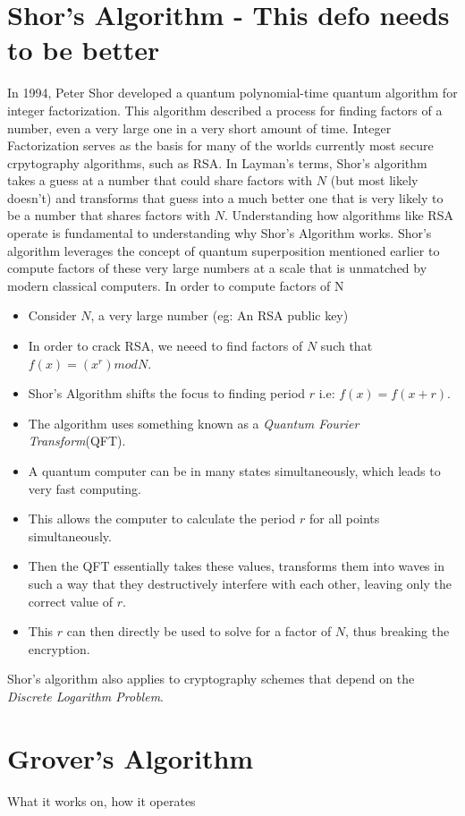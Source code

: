 \documentclass[journal]{IEEEtran}
\begin{document}
\section{Shor's Algorithm - This defo needs to be better}
In 1994, Peter Shor developed a quantum polynomial-time quantum algorithm for integer factorization. This algorithm 
described a process for finding factors of a number, even a very large one in a very short amount of time. Integer Factorization
serves as the basis for many of the worlds currently most secure crpytography algorithms, such as RSA. In Layman's terms, Shor's algorithm takes
a guess at a number that could share factors with $N$ (but most likely doesn't) and transforms that guess into a much better one
that is very likely to be a number that shares factors with $N$. Understanding how algorithms like RSA operate is fundamental to understanding why Shor's Algorithm works.
Shor's algorithm leverages the concept of quantum superposition mentioned earlier to
compute factors of these very large numbers at a scale that is unmatched by modern classical computers. In order to compute factors of N
\begin{itemize}
  \item Consider $N$, a very large number (eg: An RSA public key)
  \item In order to crack RSA, we neeed to find factors of $N$ such that $f(x)=(x^r) mod N$.
  \item Shor's Algorithm shifts the focus to finding period $r$ i.e: $f(x)=f(x+r)$. 
  \item The algorithm uses something known as a \emph{Quantum Fourier Transform}(QFT).
  \item A quantum computer can be in many states simultaneously, which leads to very fast computing.
  \item This allows the computer to calculate the period $r$ for all points simultaneously.
  \item 
  Then the QFT essentially takes these values, transforms them into waves in such a way that they 
  destructively interfere with each other, leaving only the correct value of $r$.
  \item This $r$ can then directly be used to solve for a factor of $N$, thus breaking the encryption.
\end{itemize}
Shor's algorithm also applies to cryptography schemes that depend on the \emph{Discrete Logarithm Problem}.

\section{Grover's Algorithm}
What it works on, how it operates
\end{document}
